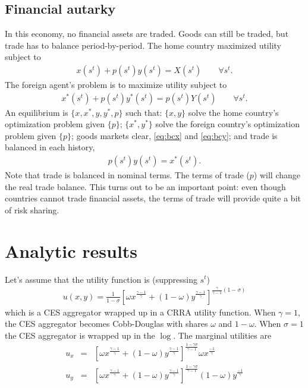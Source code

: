 \documentclass[11pt,pdftex,twoside,letterpaper]{exam}
\begin{document}
 \subsection{Financial autarky}
 In this economy, no financial assets are traded. Goods can still be traded, but trade has to balance period-by-period. The home country maximized utility subject to
 \begin{eqnarray}
   x(s^t)+p(s^t)y(s^t)=X(s^t) \qquad    \forall s^t. \label{eq:fa-hbc}
 \end{eqnarray}
 The foreign agent's problem is to maximize utility subject to
 \begin{eqnarray}
   x^*(s^t)+p(s^t)y^*(s^t)=p(s^t)Y(s^t) \qquad    \forall s^t.\label{eq:fa-fbc}
 \end{eqnarray}
 An equilibrium is $\{x,x^*, y,y^*,p\}$ such that: $\{x,y\}$ solve the home country's optimization problem given $\{p\}$; $\{x^*,y^*\}$ solve the foreign country's optimization problem given $\{p\}$; goods markets clear, \eqref{eq:bcx} and \eqref{eq:bcy}; and trade is balanced in each history,
 \begin{eqnarray}
   p\left(s^t\right)y\left(s^t\right)=x^*\left(s^t\right).
 \end{eqnarray}
 Note that trade is balanced in nominal terms. The terms of trade ($p$) will change the real trade balance. This turns out to be an important point: even though countries cannot trade financial assets, the terms of trade will provide quite a bit of risk sharing.

 \section{Analytic results}
 Let's assume that the utility function is (suppressing $s^t$)
 \begin{eqnarray}
   u(x,y) = \frac{1}{1-\sigma} \left[ \omega x^{\frac{\gamma-1}{\gamma}} + (1-\omega)y^\frac{\gamma-1}{\gamma} \right]^{\frac{\gamma}{\gamma-1}(1-\sigma)}
 \end{eqnarray}
 which is a CES aggregator wrapped up in a CRRA utility function. When $\gamma=1$, the CES aggregator becomes Cobb-Douglas with shares $\omega$ and $1-\omega$. When $\sigma=1$ the CES aggregator is wrapped up in the $\log$.
 The marginal utilities are
 \begin{eqnarray}
   u_x &=& \left[ \omega x^{\frac{\gamma-1}{\gamma}} + (1-\omega)y^\frac{\gamma-1}{\gamma} \right] ^\frac{1-\gamma \sigma}{\gamma-1} \omega x^\frac{-1}{\gamma}\\
    u_y &=& \left[ \omega x^{\frac{\gamma-1}{\gamma}} + (1-\omega)y^\frac{\gamma-1}{\gamma} \right] ^\frac{1-\gamma \sigma}{\gamma-1} (1-\omega) y^\frac{-1}{\gamma}
 \end{eqnarray}
\end{document}
